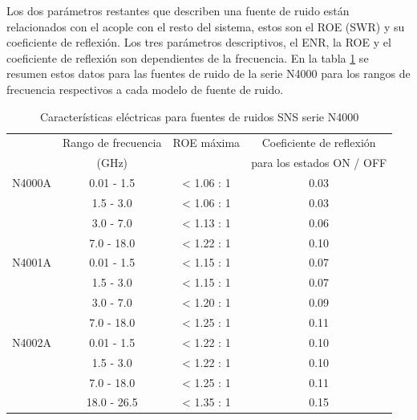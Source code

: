 	Los dos parámetros restantes que describen una fuente de ruido están relacionados con el acople con el resto del sistema, estos son el ROE (SWR) y su coeficiente de reflexión. Los tres parámetros descriptivos, el ENR, la ROE y el coeficiente de reflexión son dependientes de la frecuencia. En la tabla \ref{Tab:CaracteristicasElectricasN4000} se resumen estos datos para las fuentes de ruido de la serie N4000 para los rangos de frecuencia respectivos a cada modelo de fuente de ruido.
	
	\begin{table}[h!]
		\centering
		\begin{tabular}{cccc}
				\toprule
					& Rango de frecuencia & ROE máxima & Coeficiente de reflexión 	\\
					& (\si{\giga\hertz})  &			   & para los estados ON / OFF	\\
				\midrule
			N4000A	&	0.01 - 1.5	&	< 1.06 : 1	&	0.03	\\
					&	1.5	- 3.0	&	< 1.06 : 1	&	0.03 	\\
					&	3.0 - 7.0	&	< 1.13 : 1	&	0.06	\\
					&	7.0	- 18.0	&	< 1.22 : 1	&	0.10	\\
				\midrule
			N4001A	&	0.01 - 1.5	& 	< 1.15 : 1 	&	0.07	\\
					&	1.5 - 3.0	&	< 1.15 : 1	& 	0.07	\\
					& 	3.0 - 7.0	& 	< 1.20 : 1	&	0.09	\\
					&	7.0	- 18.0	&	< 1.25 : 1	&	0.11	\\
				\midrule
			N4002A	&	0.01 - 1.5	&	< 1.22 : 1	& 	0.10	\\
					&	1.5	- 3.0	&	< 1.22 : 1	&	0.10	\\
					&	7.0	- 18.0	&	< 1.25 : 1	&	0.11	\\
					&	18.0 - 26.5	&	< 1.35 : 1	&	0.15	\\
				\bottomrule			
		\end{tabular}
		\caption{Características eléctricas para fuentes de ruidos SNS serie N4000}
		\label{Tab:CaracteristicasElectricasN4000}
	\end{table}
	
